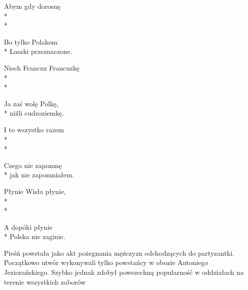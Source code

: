 \begin{lyrics}[multicol=true, longestline={''Ojcze nasz'' i ''Zdrowaś''}]
Abym gdy dorosnę\\*
\\*
\begin{markverses}[marktext={bis}]%
Bo tylko Polakom\\*
Laszki przeznaczone.
\end{markverses}

Niech Francuz Francuzkę\\*
\\*
\begin{markverses}[marktext={bis}]%
Ja zaś wolę Polkę,\\*
niźli cudzoziemkę.
\end{markverses}

I to wszystko razem\\*
\\*
\begin{markverses}[marktext={bis}]%
Czego nie zapomnę\\*
jak nie zapomniałem.
\end{markverses}

Płynie Wisła płynie,\\*
\\*
\begin{markverses}[marktext={bis}]%
A dopóki płynie\\*
Polska nie zaginie.
\end{markverses}
\end{lyrics}



\begin{info}Pieśń powstała jako akt pożegnania mężczyzn odchodzących do partyzantki. Początkowo utwór wykonywali tylko powstańcy w obozie Antoniego Jeziorańskiego. Szybko jednak zdobył powszechną popularność w oddziałach na terenie wszystkich zaborów\end{info}

